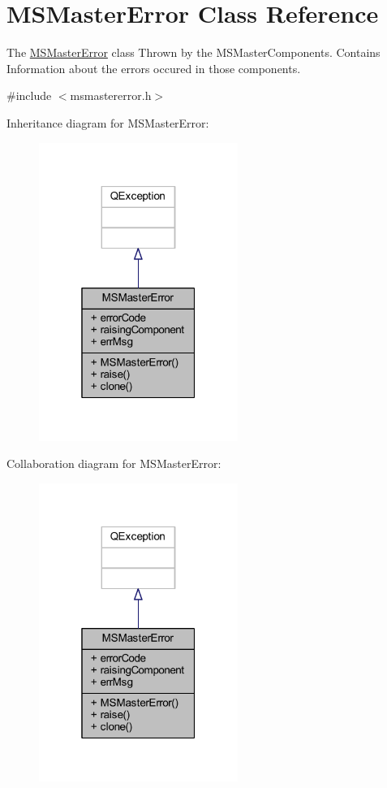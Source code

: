 \hypertarget{class_m_s_master_error}{\section{M\-S\-Master\-Error Class Reference}
\label{class_m_s_master_error}
}


The \hyperlink{class_m_s_master_error}{M\-S\-Master\-Error} class Thrown by the M\-S\-Master\-Components. Contains Information about the errors occured in those components.  




{\ttfamily \#include $<$msmastererror.\-h$>$}



Inheritance diagram for M\-S\-Master\-Error\-:\nopagebreak
\begin{figure}[H]
\begin{center}
\leavevmode
\includegraphics[width=184pt]{class_m_s_master_error__inherit__graph}
\end{center}
\end{figure}


Collaboration diagram for M\-S\-Master\-Error\-:\nopagebreak
\begin{figure}[H]
\begin{center}
\leavevmode
\includegraphics[width=184pt]{class_m_s_master_error__coll__graph}
\end{center}
\end{figure}
